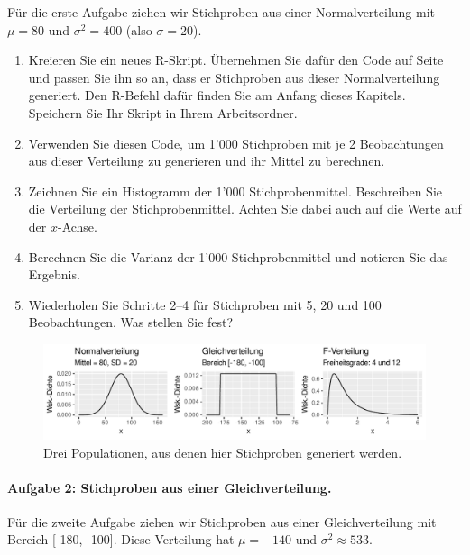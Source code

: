 \documentclass[oneside, 10pt]{book}\usepackage[]{graphicx}\usepackage[]{xcolor}
\newenvironment{knitrout}{}{} %
\begin{document}
Für die erste Aufgabe ziehen wir Stichproben aus einer
Normalverteilung mit $\mu = 80$ und $\sigma^2 = 400$ (also $\sigma = 20$).

\begin{enumerate}
\item Kreieren Sie ein neues R-Skript.
Übernehmen Sie dafür den Code auf Seite \pageref{code:stichprobenmittel}
und passen Sie ihn so an, dass er Stichproben aus dieser
Normalverteilung generiert. Den R-Befehl dafür finden Sie
am Anfang dieses Kapitels.
Speichern Sie Ihr Skript in Ihrem Arbeitsordner.

\item Verwenden Sie diesen Code, um 1'000 Stichproben mit je
2 Beobachtungen aus dieser Verteilung zu generieren und ihr Mittel
zu berechnen.

\item Zeichnen Sie ein Histogramm der 1'000 Stichprobenmittel.
Beschreiben Sie die Verteilung der Stichprobenmittel.
Achten Sie dabei auch auf die Werte auf der $x$-Achse.

\item Berechnen Sie die Varianz der 1'000 Stichprobenmittel und notieren
Sie das Ergebnis.

\item Wiederholen Sie Schritte 2--4 für Stichproben mit
5, 20 und 100 Beobachtungen. Was stellen Sie fest?
\end{enumerate}

\begin{knitrout}
\color{fgcolor}\begin{figure}[tp]

{\centering \includegraphics[width=.8\textwidth]{figs/unnamed-chunk-136-1} 

}

\caption{Drei Populationen, aus denen hier Stichproben generiert werden.\label{fig:parentpopulation}}\label{fig:unnamed-chunk-136}
\end{figure}

\end{knitrout}


\paragraph{Aufgabe 2: Stichproben aus einer Gleichverteilung.}
Für die zweite Aufgabe ziehen wir Stichproben aus einer
Gleichverteilung mit Bereich [-180, -100]. Diese Verteilung
hat $\mu = -140$ und $\sigma^2 \approx 533$.
\end{document}
